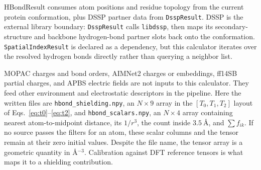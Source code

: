 \documentclass[11pt]{article}
\begin{document}
HBondResult consumes atom positions and residue topology from the current
protein conformation, plus DSSP partner data from \texttt{DsspResult}. DSSP is
the external library boundary: \texttt{DsspResult} calls \texttt{libdssp}, then
maps its secondary-structure and backbone hydrogen-bond partner slots back onto
the conformation. \texttt{SpatialIndexResult} is declared as a dependency, but
this calculator iterates over the resolved hydrogen bonds directly rather than
querying a neighbor list.

MOPAC charges and bond orders, AIMNet2 charges or embeddings, ff14SB partial
charges, and APBS electric fields are not inputs to this calculator. They feed
other environment and electrostatic descriptors in the pipeline. Here the
written files are \texttt{hbond\_shielding.npy}, an \(N\times 9\) array in the
\([T_0,T_1,T_2]\) layout of Eqs.~\eqref{eq:t0}--\eqref{eq:t2}, and
\texttt{hbond\_scalars.npy}, an \(N\times 4\) array containing nearest
atom-to-midpoint distance, its \(1/r^3\), the count inside
\(\SI{3.5}{\angstrom}\), and \(\sum f_{ik}\). If no source passes the filters
for an atom, these scalar columns and the tensor remain at their zero initial
values. Despite the file name, the tensor array is a geometric quantity in
\(\si{\angstrom^{-3}}\). Calibration against DFT reference tensors is what maps
it to a shielding contribution.
\end{document}
